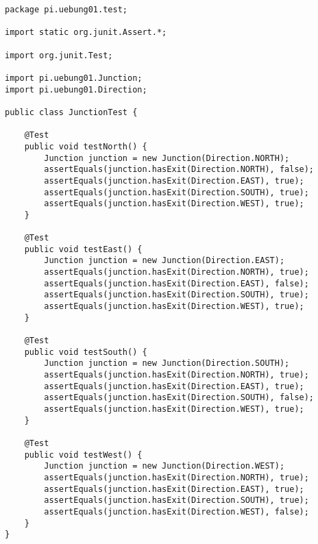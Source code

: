 \documentclass{pi2}
\begin{document}
\begin{lstlisting}
package pi.uebung01.test;

import static org.junit.Assert.*;

import org.junit.Test;

import pi.uebung01.Junction;
import pi.uebung01.Direction;

public class JunctionTest {

	@Test
	public void testNorth() {
		Junction junction = new Junction(Direction.NORTH);
		assertEquals(junction.hasExit(Direction.NORTH), false);
		assertEquals(junction.hasExit(Direction.EAST), true);
		assertEquals(junction.hasExit(Direction.SOUTH), true);
		assertEquals(junction.hasExit(Direction.WEST), true);
	}
	
	@Test
	public void testEast() {
		Junction junction = new Junction(Direction.EAST);
		assertEquals(junction.hasExit(Direction.NORTH), true);
		assertEquals(junction.hasExit(Direction.EAST), false);
		assertEquals(junction.hasExit(Direction.SOUTH), true);
		assertEquals(junction.hasExit(Direction.WEST), true);
	}
	
	@Test
	public void testSouth() {
		Junction junction = new Junction(Direction.SOUTH);
		assertEquals(junction.hasExit(Direction.NORTH), true);
		assertEquals(junction.hasExit(Direction.EAST), true);
		assertEquals(junction.hasExit(Direction.SOUTH), false);
		assertEquals(junction.hasExit(Direction.WEST), true);
	}
	
	@Test
	public void testWest() {
		Junction junction = new Junction(Direction.WEST);
		assertEquals(junction.hasExit(Direction.NORTH), true);
		assertEquals(junction.hasExit(Direction.EAST), true);
		assertEquals(junction.hasExit(Direction.SOUTH), true);
		assertEquals(junction.hasExit(Direction.WEST), false);
	}
}

\end{lstlisting}
\end{document}
